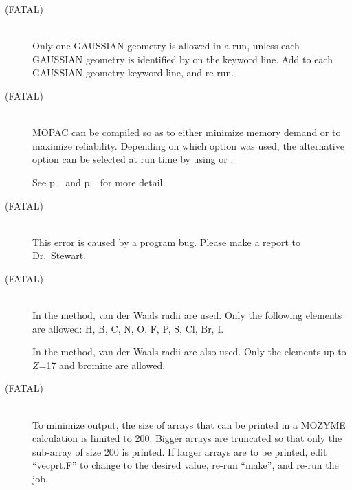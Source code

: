 \begin{description}
\item[ (FATAL)]~\\
Only one GAUSSIAN geometry is allowed in a run, unless each GAUSSIAN
geometry is identified by  on the keyword line.  Add 
to each GAUSSIAN geometry keyword line, and re-run.
 
\item[ (FATAL)]~\\
MOPAC can be compiled so as to either minimize memory demand or to
maximize reliability.  Depending on which option was used, the
alternative option can be selected at run time by using
 or .

\begin{latexonly}
See p.~\pageref{safe} and p.~\pageref{unsafe} for more detail.
\end{latexonly}
 
\item[ (FATAL)]~\\
This error is caused by a program bug.  Please make a report to Dr.~Stewart.

\item[ (FATAL)]~\\
In the  method, van der Waals radii are used. Only the following
elements are allowed: H, B, C, N, O, F, P, S, Cl, Br, I.  

In the  method, van der Waals radii are also used. Only the 
elements  up to $Z$=17 and bromine are allowed.

\item[ (FATAL)]~\\
To minimize output, the size of arrays that can be printed in a MOZYME
calculation is limited to 200.  Bigger arrays are truncated so that only 
the sub-array of size 200 is printed.  If larger arrays are to be printed, 
edit ``vecprt.F'' to change  to the desired value, re-run ``make'',
and re-run the job.


\end{description}
